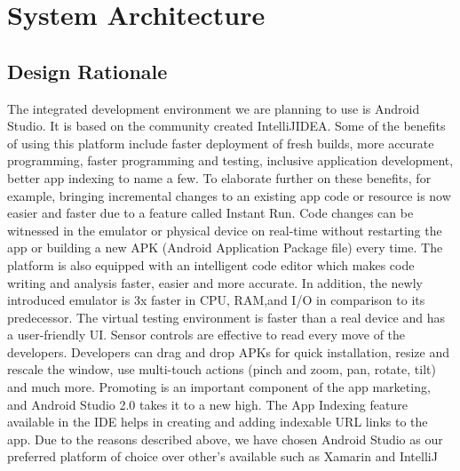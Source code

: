 \documentclass[onecolumn, draftclsnofoot,10pt, compsoc, tikz]{IEEEtran}
\begin{document}
\clearpage

\section{System Architecture}

\subsection{Design Rationale}
The integrated development environment we are planning to use is Android Studio. It is based on the community created IntelliJIDEA. Some of the benefits of using this platform include faster deployment of fresh builds, more accurate programming, faster programming and testing, inclusive application development, better app indexing to name a few.  To elaborate further on these benefits, for example, bringing incremental changes to an existing app code or resource is now easier and faster due to a feature called Instant Run. Code changes can be witnessed in the emulator or physical device on real-time without restarting the app or building a new APK (Android Application Package file) every time. The platform is also equipped with an intelligent code editor which makes code writing and analysis faster, easier and more accurate. In addition, the newly introduced emulator is 3x faster in CPU, RAM,and I/O in comparison to its predecessor. The virtual testing environment is faster than a real device and has a user-friendly UI. Sensor controls are effective to read every move of the developers. Developers can drag and drop APKs for quick installation, resize and rescale the window, use multi-touch actions (pinch and zoom, pan, rotate, tilt) and much more. Promoting is an important component of the app marketing, and Android Studio 2.0 takes it to a new high. The App Indexing feature available in the IDE helps in creating and adding indexable URL links to the app. Due to the reasons described above, we have chosen Android Studio as our preferred platform of choice over other’s available such as Xamarin and IntelliJ

\clearpage

\end{document}

